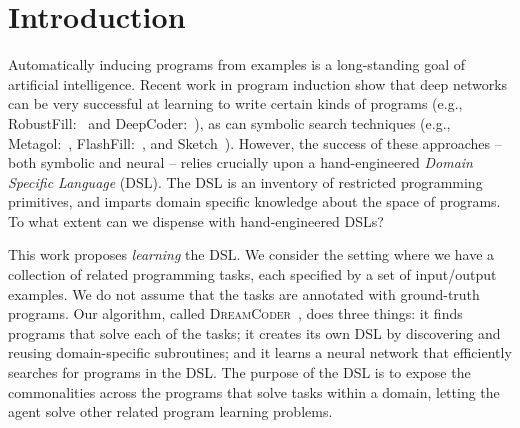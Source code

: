 \documentclass{article}
\newcommand{\system}{\textsc{DreamCoder}~}
\begin{document}
\printAffiliationsAndNotice{\icmlEqualContribution} %

\begin{abstract}
  Successful approaches to program induction require a
  hand-engineered domain-specific language (DSL),
  constraining the space of allowed programs and imparting
  prior knowledge of the domain.
  We contribute a program learning algorithm
  called \system
  that infers a DSL
  and trains a neural network to
  efficiently search for programs in the learned DSL.
  We use our model to build circuits,
  edit strings, do symbolic regression,
  and synthesize Lisp-style functions on lists,
  in each case showing that
  \system learns a domain-specific vocabulary for expressing programs.
  
  
  
  
  

\end{abstract}

\section{Introduction}

Automatically inducing programs from examples is a long-standing goal
of artificial intelligence.  Recent work in program induction show
that deep networks can be very successful at learning to write certain
kinds of programs (e.g., RobustFill:~\cite{devlin2017robustfill} and
DeepCoder:~\cite{balog2016deepcoder}), as can symbolic search
techniques (e.g., Metagol:~\cite{muggleton2015meta},
FlashFill:~\cite{gulwani2011automating}, and Sketch~\cite{solar2008program}).
However, the success of these approaches -- both symbolic and neural --
relies crucially upon a hand-engineered \emph{Domain Specific Language} (DSL).
The DSL is an inventory of restricted programming primitives,
and imparts domain specific knowledge about the space of programs.
To what extent can we dispense with hand-engineered DSLs?

This work proposes \emph{learning} the DSL.
We consider the setting where we have a collection of related programming tasks,
each specified by a set of input/output examples.
We do not assume that the tasks are annotated with
ground-truth programs.
Our algorithm, called \system,
does three things:
it finds programs that solve each of the tasks;
it creates its own DSL by discovering and reusing
domain-specific subroutines;
and it learns a neural network that
efficiently searches for programs in the DSL.
The purpose of the DSL
is to expose the commonalities across the programs that solve tasks within a domain,
letting the agent solve other related program learning problems.
\end{document}
